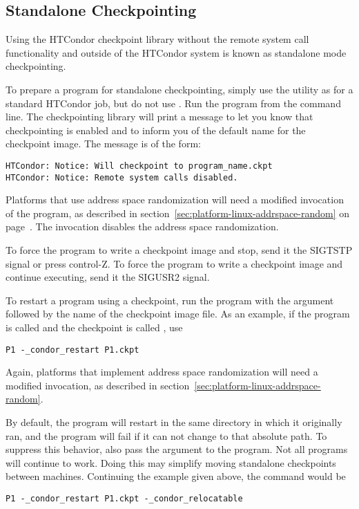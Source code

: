 \subsection{\label{sec:standalone-ckpt}Standalone Checkpointing}

Using the HTCondor checkpoint library without the remote system call
functionality and outside of the HTCondor system is known as standalone
mode checkpointing.

To prepare a program for standalone checkpointing, simply use the
 utility as for a standard HTCondor job, 
but do not use .
Run the program from the command line.
The checkpointing library will print a message to let you know
that checkpointing is enabled and to inform you of the default
name for the checkpoint image.
The message is of the form:

\footnotesize
\begin{verbatim}
HTCondor: Notice: Will checkpoint to program_name.ckpt
HTCondor: Notice: Remote system calls disabled.
\end{verbatim}
\normalsize

Platforms that use address space randomization will need
a modified invocation of the program,
as described in section~\ref{sec:platform-linux-addrspace-random} on
page~\pageref{sec:platform-linux-addrspace-random}.
The invocation disables the address space randomization.
 
To force the program to write a checkpoint image and stop, send it
the SIGTSTP signal or press control-Z.  To force the program to 
write a checkpoint image and continue executing, send it the
SIGUSR2 signal.

To restart a program using a checkpoint, run the program
with the argument
 followed by the name of the checkpoint
image file.
As an example, if the program is called  and
the checkpoint is called , use
\begin{verbatim}
P1 -_condor_restart P1.ckpt
\end{verbatim}
Again, platforms that implement address space randomization will
need a modified invocation,
as described in section~\ref{sec:platform-linux-addrspace-random}.

By default, the program will restart in the same directory 
in which it originally ran, 
and the program will fail if it can not change to that absolute path.
To suppress this behavior, 
also pass the  argument 
to the program. 
Not all programs will continue to work.  
Doing this may simplify moving standalone checkpoints between machines.
Continuing the example given above,
the command would be
\begin{verbatim}
P1 -_condor_restart P1.ckpt -_condor_relocatable
\end{verbatim}

